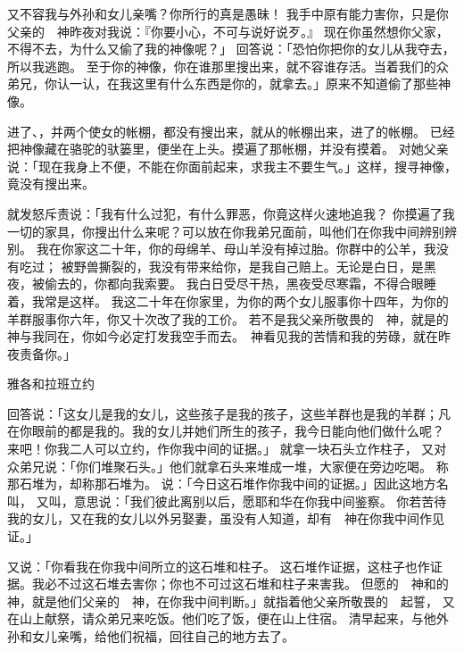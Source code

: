 {又不容我与外孙和女儿亲嘴？你所行的真是愚昧！
我手中原有能力害你，只是你父亲的　神昨夜对我说：『你要小心，不可与{}说好说歹。』
现在你虽然想你父家，不得不去，为什么又偷了我的神像呢？」
回答{}说：「恐怕你把你的女儿从我夺去，所以我逃跑。
至于你的神像，你在谁那里搜出来，就不容谁存活。当着我们的众弟兄，你认一认，在我这里有什么东西是你的，就拿去。」原来{}不知道{}偷了那些神像。
\par }{\PP {}进了{}、{}，并两个使女的帐棚，都没有搜出来，就从{}的帐棚出来，进了{}的帐棚。
已经把神像藏在骆驼的驮篓里，便坐在上头。{}摸遍了那帐棚，并没有摸着。
对她父亲说：「现在我身上不便，不能在你面前起来，求我主不要生气。」这样，{}搜寻神像，竟没有搜出来。
\par }{\PP {}就发怒斥责{}说：「我有什么过犯，有什么罪恶，你竟这样火速地追我？
你摸遍了我一切的家具，你搜出什么来呢？可以放在你我弟兄面前，叫他们在你我中间辨别辨别。
我在你家这二十年，你的母绵羊、母山羊没有掉过胎。你群中的公羊，我没有吃过；
被野兽撕裂的，我没有带来给你，是我自己赔上。无论是白日，是黑夜，被偷去的，你都向我索要。
我白日受尽干热，黑夜受尽寒霜，不得合眼睡着，我常是这样。
我这二十年在你家里，为你的两个女儿服事你十四年，为你的羊群服事你六年，你又十次改了我的工价。
若不是我父亲{}所敬畏的　神，就是{}的　神与我同在，你如今必定打发我空手而去。　神看见我的苦情和我的劳碌，就在昨夜责备你。」
\par }{\SH 雅各和拉班立约
\par }{\PP {}回答{}说：「这女儿是我的女儿，这些孩子是我的孩子，这些羊群也是我的羊群；凡在你眼前的都是我的。我的女儿并她们所生的孩子，我今日能向他们做什么呢？
来吧！你我二人可以立约，作你我中间的证据。」
就拿一块石头立作柱子，
又对众弟兄说：「你们堆聚石头。」他们就拿石头来堆成一堆，大家便在旁边吃喝。
称那石堆为{}，{}却称那石堆为{}。
说：「今日这石堆作你我中间的证据。」因此这地方名叫{}，
又叫{}，意思说：「我们彼此离别以后，愿耶和华在你我中间鉴察。
你若苦待我的女儿，又在我的女儿以外另娶妻，虽没有人知道，却有　神在你我中间作见证。」
\par }{\PP {}又说：「你看我在你我中间所立的这石堆和柱子。
这石堆作证据，这柱子也作证据。我必不过这石堆去害你；你也不可过这石堆和柱子来害我。
但愿{}的　神和{}的　神，就是他们父亲的　神，在你我中间判断。」{}就指着他父亲{}所敬畏的　{}起誓，
又在山上献祭，请众弟兄来吃饭。他们吃了饭，便在山上住宿。
清早起来，与他外孙和女儿亲嘴，给他们祝福，回往自己的地方去了。

}
